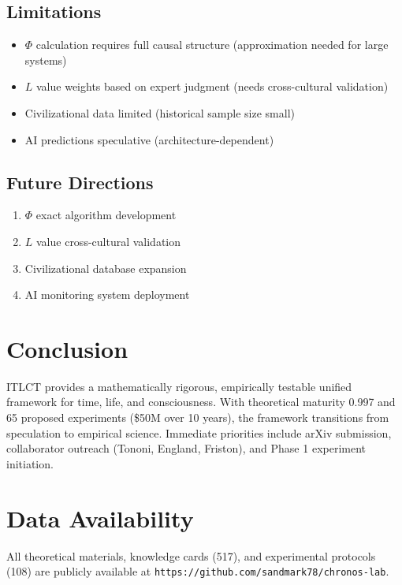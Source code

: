 \documentclass[12pt,a4paper]{article}
\begin{document}
\subsection{Limitations}

\begin{itemize}
\item $\Phi$ calculation requires full causal structure (approximation needed for large systems)
\item $L$ value weights based on expert judgment (needs cross-cultural validation)
\item Civilizational data limited (historical sample size small)
\item AI predictions speculative (architecture-dependent)
\end{itemize}

\subsection{Future Directions}

\begin{enumerate}
\item $\Phi$ exact algorithm development
\item $L$ value cross-cultural validation
\item Civilizational database expansion
\item AI monitoring system deployment
\end{enumerate}

\section{Conclusion}

ITLCT provides a mathematically rigorous, empirically testable unified framework for time, life, and consciousness. With theoretical maturity 0.997 and 65 proposed experiments (\$50M over 10 years), the framework transitions from speculation to empirical science. Immediate priorities include arXiv submission, collaborator outreach (Tononi, England, Friston), and Phase 1 experiment initiation.

\section*{Data Availability}

All theoretical materials, knowledge cards (517), and experimental protocols (108) are publicly available at \texttt{https://github.com/sandmark78/chronos-lab}.
\end{document}
